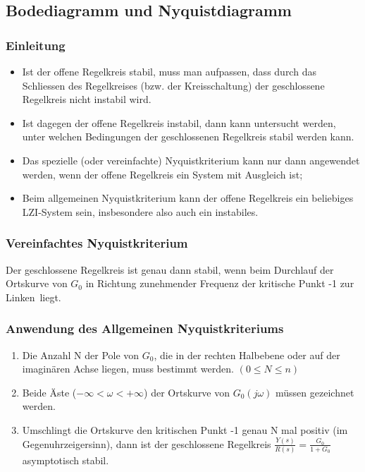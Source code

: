 \subsection{Bodediagramm und Nyquistdiagramm }
\subsubsection{Einleitung}
\begin{itemize}
	\item Ist der offene Regelkreis stabil, muss man aufpassen, dass durch das Schliessen
	des Regelkreises (bzw. der Kreisschaltung) der geschlossene Regelkreis nicht instabil
	wird.
	\item Ist dagegen der offene Regelkreis instabil, dann kann untersucht werden, unter
	welchen Bedingungen der geschlossenen Regelkreis stabil werden kann.
	\item Das
	spezielle (oder vereinfachte) Nyquistkriterium kann nur dann angewendet werden,
	wenn der offene Regelkreis ein System mit Ausgleich ist;
	\item Beim allgemeinen Nyquistkriterium
	kann der offene Regelkreis ein beliebiges LZI-System sein, insbesondere also auch
	ein instabiles.
\end{itemize}
\subsubsection{Vereinfachtes Nyquistkriterium}
		Der geschlossene Regelkreis ist genau dann stabil, wenn beim Durchlauf der
		Ortskurve von $G_0$ in Richtung zunehmender Frequenz der kritische Punkt -1 \glqq zur
		Linken\grqq\ liegt.

\subsubsection{Anwendung des Allgemeinen Nyquistkriteriums }
\begin{enumerate}
\item Die Anzahl N der Pole von $G_0$, die in der rechten Halbebene oder auf der
imaginären Achse liegen, muss bestimmt werden. $(0 \leq N \leq n)$
\item Beide Äste ($-\infty < \omega < +\infty$) der Ortskurve von $G_0(j\omega)$ müssen gezeichnet werden.
\item Umschlingt die Ortskurve den kritischen Punkt -1 genau N mal positiv (im
Gegenuhrzeigersinn), dann ist der geschlossene Regelkreis 
$\frac{Y(s)}{R(s)} = \frac{G_0}{1+G_0}$ asymptotisch stabil.
\end{enumerate}

